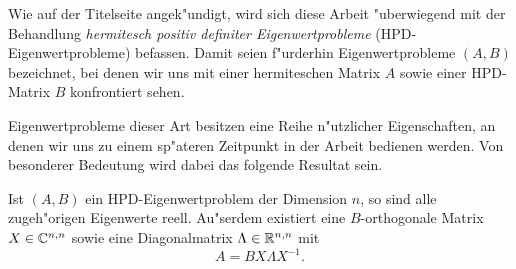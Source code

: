 Wie auf der Titelseite angek"undigt, wird sich diese Arbeit "uberwiegend mit der Behandlung \emph{hermitesch positiv definiter Eigenwertprobleme} (HPD-Eigenwertprobleme) befassen.
Damit seien f"urderhin Eigenwertprobleme $(A,B)$ bezeichnet, bei denen wir uns mit einer hermiteschen Matrix $A$ sowie einer HPD-Matrix $B$ konfrontiert sehen.

\newpage
Eigenwertprobleme dieser Art besitzen eine Reihe n"utzlicher Eigenschaften, an denen wir uns zu einem sp"ateren Zeitpunkt in der Arbeit bedienen werden.
Von besonderer Bedeutung wird dabei das folgende Resultat sein.

\begin{thm}\label{thm:chap2:realEigenvalues}
Ist $(A,B)$ ein HPD-Eigenwertproblem der Dimension $n$, so sind alle zugeh"origen Eigenwerte reell.
Au"serdem existiert eine $B$-orthogonale Matrix $X\in\mathbb{C}^{n,n}$ sowie eine Diagonalmatrix $\Lambda\in\mathbb{R}^{n,n}$ mit
\begin{equation}\label{eq:chap2:evpMatrix}
A = BX\Lambda X^{-1}.
\end{equation}
\end{thm}

